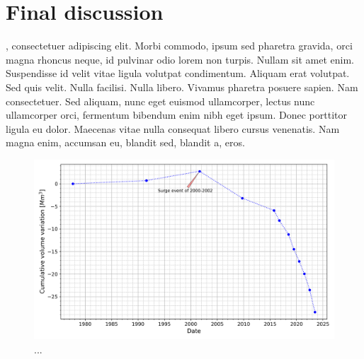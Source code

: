 \graphicspath{{figures/chapter6/}}
\onehalfspacing

\chapter{Final discussion}\label{ch:6}

, consectetuer adipiscing elit. Morbi commodo,
ipsum sed pharetra gravida, orci magna rhoncus neque, id pulvinar odio lorem non turpis.
Nullam sit amet enim. Suspendisse id velit vitae ligula volutpat condimentum. Aliquam
erat volutpat. Sed quis velit. Nulla facilisi. Nulla libero. Vivamus pharetra posuere
sapien. Nam consectetuer. Sed aliquam, nunc eget euismod ullamcorper, lectus nunc
ullamcorper orci, fermentum bibendum enim nibh eget ipsum. Donec porttitor ligula eu
dolor. Maecenas vitae nulla consequat libero cursus venenatis. Nam magna enim, accumsan
eu, blandit sed, blandit a, eros.


\begin{figure}
  \centering
  \includegraphics[width=\textwidth]{cumulative_volumes_all.png}
  \caption{...}
  \label{fig:6:cumulative_volumes}
\end{figure}
